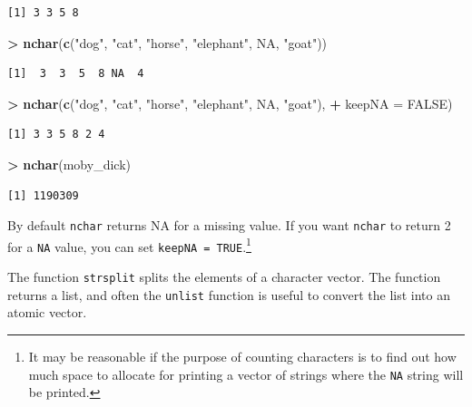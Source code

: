 \documentclass[]{krantz}
\makeatletter
\newenvironment{Shaded}{\begin{snugshade}}{\end{snugshade}}
\newcommand{\DataTypeTok}[1]{\textcolor[rgb]{0.27,0.27,0.27}{#1}}
\newcommand{\KeywordTok}[1]{\textcolor[rgb]{0.27,0.27,0.27}{\textbf{#1}}}
\newcommand{\NormalTok}[1]{#1}
\newcommand{\OperatorTok}[1]{\textcolor[rgb]{0.43,0.43,0.43}{\textbf{#1}}}
\newcommand{\OtherTok}[1]{\textcolor[rgb]{0.37,0.37,0.37}{#1}}
\newcommand{\StringTok}[1]{\textcolor[rgb]{0.5,0.5,0.5}{#1}}
\newenvironment{kframe}{%
\medskip{}
\setlength{\fboxsep}{.8em}
 \def\at@end@of@kframe{}%
 \ifinner\ifhmode%
  \def\at@end@of@kframe{\end{minipage}}%
  \begin{minipage}{\columnwidth}%
 \fi\fi%
 \def\FrameCommand##1{\hskip\@totalleftmargin \hskip-\fboxsep
 \colorbox{shadecolor}{##1}\hskip-\fboxsep
     \hskip-\linewidth \hskip-\@totalleftmargin \hskip\columnwidth}%
 \MakeFramed {\advance\hsize-\width
   \@totalleftmargin\z@ \linewidth\hsize
   \@setminipage}}%
 {\par\unskip\endMakeFramed%
 \at@end@of@kframe}
\renewenvironment{Shaded}{\begin{kframe}}{\end{kframe}}
\makeatother
\begin{document}
\begin{verbatim}
[1] 3 3 5 8
\end{verbatim}

\begin{Shaded}
\begin{Highlighting}[]
\OperatorTok{>}\StringTok{ }\KeywordTok{nchar}\NormalTok{(}\KeywordTok{c}\NormalTok{(}\StringTok{"dog"}\NormalTok{, }\StringTok{"cat"}\NormalTok{, }\StringTok{"horse"}\NormalTok{, }\StringTok{"elephant"}\NormalTok{, }\OtherTok{NA}\NormalTok{, }\StringTok{"goat"}\NormalTok{))}
\end{Highlighting}
\end{Shaded}

\begin{verbatim}
[1]  3  3  5  8 NA  4
\end{verbatim}

\begin{Shaded}
\begin{Highlighting}[]
\OperatorTok{>}\StringTok{ }\KeywordTok{nchar}\NormalTok{(}\KeywordTok{c}\NormalTok{(}\StringTok{"dog"}\NormalTok{, }\StringTok{"cat"}\NormalTok{, }\StringTok{"horse"}\NormalTok{, }\StringTok{"elephant"}\NormalTok{, }\OtherTok{NA}\NormalTok{, }\StringTok{"goat"}\NormalTok{), }
\OperatorTok{+}\StringTok{   }\DataTypeTok{keepNA =} \OtherTok{FALSE}\NormalTok{)}
\end{Highlighting}
\end{Shaded}

\begin{verbatim}
[1] 3 3 5 8 2 4
\end{verbatim}

\begin{Shaded}
\begin{Highlighting}[]
\OperatorTok{>}\StringTok{ }\KeywordTok{nchar}\NormalTok{(moby_dick)}
\end{Highlighting}
\end{Shaded}

\begin{verbatim}
[1] 1190309
\end{verbatim}

By default \texttt{nchar} returns NA for a missing value. If you want \texttt{nchar} to return 2 for a \texttt{NA} value, you can set \texttt{keepNA\ =\ TRUE}.\footnote{It may be reasonable if the purpose of counting characters is to find out how much space to allocate for printing a vector of strings where the \texttt{NA} string will be printed.}

The function \texttt{strsplit} splits the elements of a character vector. The function returns a list, and often the \texttt{unlist} function is useful to convert the list into an atomic vector.
\end{document}
